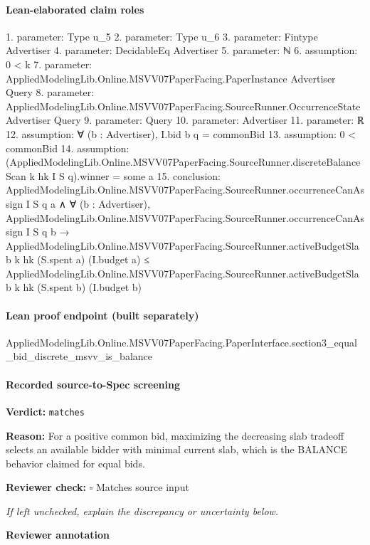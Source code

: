 \documentclass[10pt]{article}
\newcommand{\reviewerbox}{%
  \par\noindent\fbox{\parbox{0.96\linewidth}{\rule{0pt}{0.38in}}}\par
}
\newcommand{\reviewmatch}[1]{%
  \par\noindent\textbf{Reviewer check:} $\square$\; #1\par
  \noindent\emph{If left unchecked, explain the discrepancy or uncertainty below.}\par
}
\begin{document}
\paragraph{Lean-elaborated claim roles}\begin{ReviewVerbatim}
1. parameter: Type u_5
2. parameter: Type u_6
3. parameter: Fintype Advertiser
4. parameter: DecidableEq Advertiser
5. parameter: ℕ
6. assumption: 0 < k
7. parameter: AppliedModelingLib.Online.MSVV07PaperFacing.PaperInstance Advertiser Query
8. parameter: AppliedModelingLib.Online.MSVV07PaperFacing.SourceRunner.OccurrenceState Advertiser Query
9. parameter: Query
10. parameter: Advertiser
11. parameter: ℝ
12. assumption: ∀ (b : Advertiser), I.bid b q = commonBid
13. assumption: 0 < commonBid
14. assumption: (AppliedModelingLib.Online.MSVV07PaperFacing.SourceRunner.discreteBalanceScan k hk I S q).winner = some a
15. conclusion: AppliedModelingLib.Online.MSVV07PaperFacing.SourceRunner.occurrenceCanAssign I S q a ∧
  ∀ (b : Advertiser),
    AppliedModelingLib.Online.MSVV07PaperFacing.SourceRunner.occurrenceCanAssign I S q b →
      AppliedModelingLib.Online.MSVV07PaperFacing.SourceRunner.activeBudgetSlab k hk (S.spent a) (I.budget a) ≤
        AppliedModelingLib.Online.MSVV07PaperFacing.SourceRunner.activeBudgetSlab k hk (S.spent b) (I.budget b)
\end{ReviewVerbatim}

\paragraph{Lean proof endpoint (built separately)}\begin{ReviewVerbatim}
AppliedModelingLib.Online.MSVV07PaperFacing.PaperInterface.section3_equal_bid_discrete_msvv_is_balance
\end{ReviewVerbatim}

\paragraph{Recorded source-to-Spec screening}
\textbf{Verdict:} \texttt{matches}
\\
{\raggedright
\textbf{Reason:} For a positive common bid, maximizing the decreasing slab tradeoff selects an available bidder with minimal current slab, which is the BALANCE behavior claimed for equal bids.\allowbreak{}
\par}
\reviewmatch{Matches source input}
\noindent\textbf{Reviewer annotation}\par
\reviewerbox
\clearpage
\hypertarget{source-claim-87341a8300470279}{}
\end{document}
